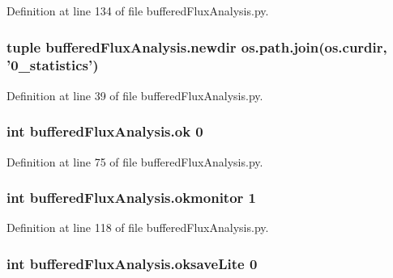 Definition at line 134 of file buffered\-Flux\-Analysis.\-py.

\hypertarget{namespacebuffered_flux_analysis_a90d7a1a691a7ba3f095a06b940e152c9}{
\subsubsection[{newdir}]{\setlength{\rightskip}{0pt plus 5cm}tuple buffered\-Flux\-Analysis.\-newdir os.\-path.\-join(os.\-curdir, '0\-\_\-statistics')}}\label{namespacebuffered_flux_analysis_a90d7a1a691a7ba3f095a06b940e152c9}


Definition at line 39 of file buffered\-Flux\-Analysis.\-py.

\hypertarget{namespacebuffered_flux_analysis_a2ca9e7b06751f98dec759e29fb4e0ff1}{
\subsubsection[{ok}]{\setlength{\rightskip}{0pt plus 5cm}int buffered\-Flux\-Analysis.\-ok 0}}\label{namespacebuffered_flux_analysis_a2ca9e7b06751f98dec759e29fb4e0ff1}


Definition at line 75 of file buffered\-Flux\-Analysis.\-py.

\hypertarget{namespacebuffered_flux_analysis_a25fb267e09b519680d3f5d767eaa526c}{
\subsubsection[{okmonitor}]{\setlength{\rightskip}{0pt plus 5cm}int buffered\-Flux\-Analysis.\-okmonitor 1}}\label{namespacebuffered_flux_analysis_a25fb267e09b519680d3f5d767eaa526c}


Definition at line 118 of file buffered\-Flux\-Analysis.\-py.

\hypertarget{namespacebuffered_flux_analysis_a8df8abbeab32a9f551cce00c3f8fc1b5}{
\subsubsection[{oksave\-Lite}]{\setlength{\rightskip}{0pt plus 5cm}int buffered\-Flux\-Analysis.\-oksave\-Lite 0}}\label{namespacebuffered_flux_analysis_a8df8abbeab32a9f551cce00c3f8fc1b5}


